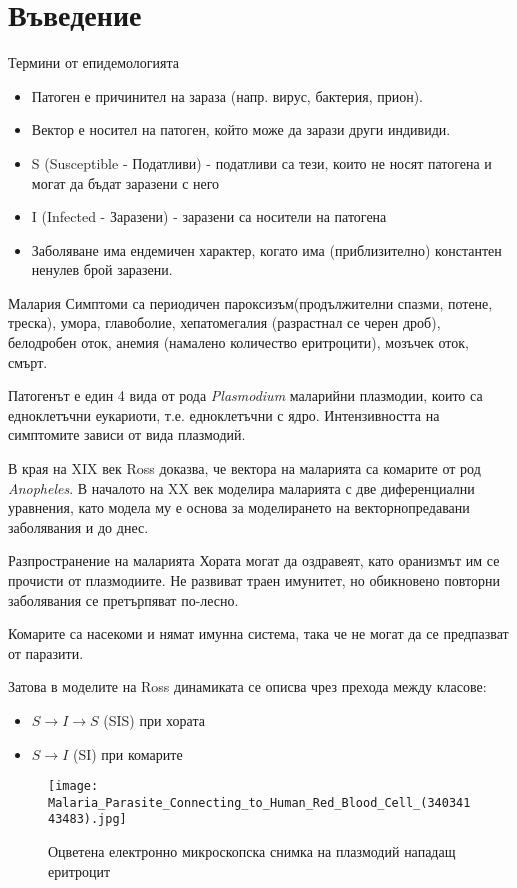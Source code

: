 \section{\hspace{1em}Въведение}
\begin{frame}[t]{Термини от епидемологията}
  \begin{itemize}
    \item Патоген е причинител на зараза (напр. вирус, бактерия, прион).
    \item Вектор е носител на патоген, който може да зарази други индивиди.
    \item S (Susceptible - Податливи) - податливи са тези, които не носят патогена и могат да бъдат заразени с него
    \item I (Infected - Заразени) - заразени са носители на патогена
    \item Заболяване има ендемичен характер, когато има (приблизително) константен ненулев брой заразени.
  \end{itemize}
\end{frame}

\begin{frame}[t]{Малария}
  Симптоми са периодичен пароксизъм(продължителни спазми, потене, треска), умора, главоболие, хепатомегалия (разрастнал се черен дроб), белодробен оток, анемия (намалено количество еритроцити), мозъчек оток, смърт.

  Патогенът е един 4 вида от рода \textit{Plasmodium} маларийни плазмодии, които са едноклетъчни еукариоти, т.е. едноклетъчни с ядро. Интензивността на симптомите зависи от вида плазмодий.

  В края на XIX век Ross доказва, че вектора на маларията са комарите от род \textit{Anopheles}.
  В началото на XX век моделира маларията с две диференциални уравнения, като модела му е основа за моделирането на векторнопредавани заболявания и до днес.
\end{frame}

\begin{frame}[t]{Разпространение на маларията}
  Хората могат да оздравеят, като оранизмът им се прочисти от плазмодиите.
  Не развиват траен имунитет, но обикновено повторни заболявания се претърпяват по-лесно.

  Комарите са насекоми и нямат имунна система, така че не могат да се предпазват от паразити.

  Затова в моделите на Ross динамиката се описва чрез прехода между класове:
  \begin{itemize}
    \item $S \rightarrow I \rightarrow S$ (SIS) при хората
    \item $S \rightarrow I$ (SI) при комарите
  \end{itemize}

  \begin{figure}
    \texttt{[image: Malaria\_Parasite\_Connecting\_to\_Human\_Red\_Blood\_Cell\_(34034143483).jpg]}
    \centering
    \caption{Оцветена електронно микроскопска снимка на плазмодий нападащ еритроцит}
  \end{figure}
\end{frame}
